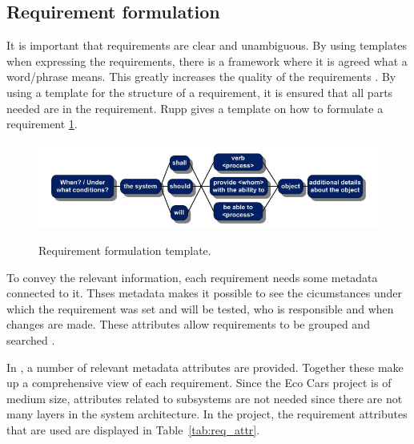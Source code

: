 \subsection{Requirement formulation}
It is important that requirements are clear and unambiguous. By using templates
when expressing the requirements, there is a framework where it is agreed what a
word/phrase means. This greatly increases the quality of the requirements
\cite{rupp2014}. By using a template for the structure of a requirement, it is
ensured that all parts needed are in the requirement. Rupp \cite{rupp2014}
gives a template on how to formulate a requirement \ref{fig:req_template}.

\begin{figure}[H]
    \centering
    \includegraphics[width=\textwidth]{./img/introduction_req_template}
    \label{fig:req_template}
    \caption{Requirement formulation template.}
\end{figure}

To convey the relevant information, each requirement needs some metadata
connected to it. Thses metadata makes it possible to see the cicumstances under
which the requirement was set and will be tested, who is responsible and when
changes are made. These attributes allow requirements to be grouped and searched
\cite{ibm_req}.

In \cite{ibm_req}, a number of relevant metadata attributes are provided.
Together these make up a comprehensive view of each requirement. Since the Eco
Cars project is of medium size, attributes related to subsystems are not needed
since there are not many layers in the system architecture. In the project, the
requirement attributes that are used are displayed in Table~\ref{tab:req_attr}.

